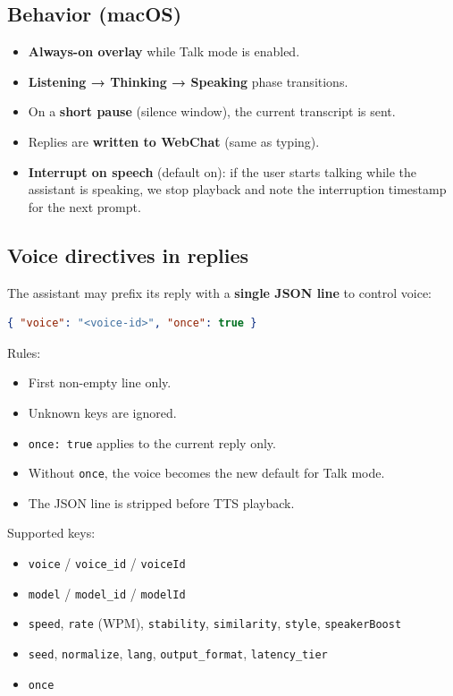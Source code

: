 \subsection{Behavior (macOS)}


\begin{itemize}
  \item \textbf{Always-on overlay} while Talk mode is enabled.
  \item \textbf{Listening → Thinking → Speaking} phase transitions.
  \item On a \textbf{short pause} (silence window), the current transcript is sent.
  \item Replies are \textbf{written to WebChat} (same as typing).
  \item \textbf{Interrupt on speech} (default on): if the user starts talking while the assistant is speaking, we stop playback and note the interruption timestamp for the next prompt.
\end{itemize}


\subsection{Voice directives in replies}


The assistant may prefix its reply with a \textbf{single JSON line} to control voice:

\begin{lstlisting}[language=json]
{ "voice": "<voice-id>", "once": true }
\end{lstlisting}


Rules:

\begin{itemize}
  \item First non-empty line only.
  \item Unknown keys are ignored.
  \item \texttt{once: true} applies to the current reply only.
  \item Without \texttt{once}, the voice becomes the new default for Talk mode.
  \item The JSON line is stripped before TTS playback.
\end{itemize}


Supported keys:

\begin{itemize}
  \item \texttt{voice} / \texttt{voice\_id} / \texttt{voiceId}
  \item \texttt{model} / \texttt{model\_id} / \texttt{modelId}
  \item \texttt{speed}, \texttt{rate} (WPM), \texttt{stability}, \texttt{similarity}, \texttt{style}, \texttt{speakerBoost}
  \item \texttt{seed}, \texttt{normalize}, \texttt{lang}, \texttt{output\_format}, \texttt{latency\_tier}
  \item \texttt{once}
\end{itemize}


